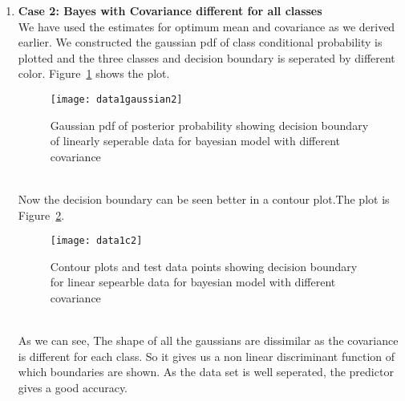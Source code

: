 \documentclass[11pt,paper=a4,answers]{exam}
\begin{document}
\begin{questions}
\begin{enumerate}[i.]
\begin{enumerate}
            \item \textbf{Case 2: Bayes with Covariance different for all classes}\\
            We have used the estimates for optimum mean and covariance as we derived earlier. We constructed the gaussian pdf of class conditional probability is plotted and the three classes and decision boundary is seperated by different color. Figure~\ref{fig:data1g2} shows the plot.\\
            \begin{figure}[ht]
                \centering
                \texttt{[image: data1gaussian2]}
                \vspace{-30pt}
                \caption{Gaussian pdf of posterior probability showing decision boundary of linearly seperable data for bayesian model with different covariance}
                \label{fig:data1g2}
            \end{figure}\\
            Now the decision boundary can be seen better in a contour plot.The plot is Figure~\ref{fig:data1c2}.\\ 
            \begin{figure}[ht]
                \centering
                \texttt{[image: data1c2]}
                \vspace{-30pt}
                \caption{Contour plots and test data points showing decision boundary for linear sepearble data for bayesian model with different covariance}
                \label{fig:data1c2}
            \end{figure}\\
            As we can see, The shape of all the gaussians are dissimilar as the covariance is different for each class. So it gives us a non linear discriminant function of which boundaries are shown. As the data set is well seperated, the predictor gives a good accuracy.


\end{enumerate}
\end{enumerate}
\end{questions}
\end{document}
